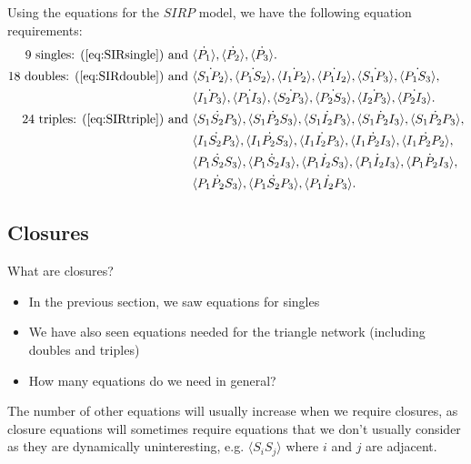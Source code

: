 \documentclass[unknownkeysallowed]{beamer}
\begin{document}
\begin{frame}

Using the equations for the $SIRP$ model, we have the following equation requirements:
\begin{align*}
\text{9 singles: (} \ref{eq:SIRsingle} \text{) and } & \dot{\langle P_1 \rangle}, \dot{\langle P_2 \rangle}, \dot{\langle P_3 \rangle}.\\
\text{18 doubles: (} \ref{eq:SIRdouble} \text{) and }& \dot{\langle S_1 P_2 \rangle},\dot{\langle P_1 S_2 \rangle}, \dot{\langle I_1 P_2 \rangle}, \dot{\langle P_1 I_2 \rangle}, \dot{\langle S_1 P_3\rangle}, \dot{\langle P_1 S_3 \rangle},\\ & \dot{\langle I_1 P_3 \rangle}, \dot{\langle P_1 I_3 \rangle}, \dot{\langle S_2 P_3 \rangle}, \dot{\langle P_2 S_3 \rangle}, \dot{\langle I_2 P_3 \rangle}, \dot{\langle P_2 I_3 \rangle}. \\
\text{24 triples: (} \ref{eq:SIRtriple} \text{) and } & \dot{\langle S_1 S_2 P_3 \rangle}, \dot{\langle S_1 P_2 S_3 \rangle}, \dot{\langle S_1 I_2 P_3\rangle}, \dot{\langle S_1 P_2 I_3 \rangle}, \dot{\langle S_1 P_2 P_3\rangle}, \\
& \dot{\langle I_1 S_2 P_3 \rangle}, \dot{\langle I_1 P_2 S_3 \rangle}, \dot{\langle I_1 I_2 P_3 \rangle}, \dot{\langle I_1 P_2 I_3 \rangle}, \dot{\langle I_1 P_2 P_2 \rangle},\\
& \dot{\langle P_1 S_2 S_3 \rangle}, \dot{\langle P_1 S_2 I_3 \rangle}, \dot{\langle P_1 I_2 S_3 \rangle}, \dot{\langle P_1 I_2 I_3 \rangle}, \dot{\langle P_1 P_2 I_3 \rangle}, \\
& \dot{\langle P_1 P_2 S_3 \rangle}, \dot{\langle P_1 S_2 P_3 \rangle},  \dot{\langle P_1 I_2 P_3\rangle}.
\end{align*}

\end{frame}

\subsection{Closures}

\begin{frame}{What are closures?}

\begin{itemize}
	\pause
	\item In the previous section, we saw equations for singles 
	\pause
	\item We have also seen equations needed for the triangle network (including doubles and triples)
	\pause 
	\item How many equations do we need in general?
\end{itemize}
\pause
The number of other equations will usually increase when we require closures, as closure equations will sometimes require equations that we don't usually consider as they are dynamically uninteresting, e.g. $\langle S_i S_j \rangle$ where $i$ and $j$ are adjacent.

\end{frame}
\end{document}
